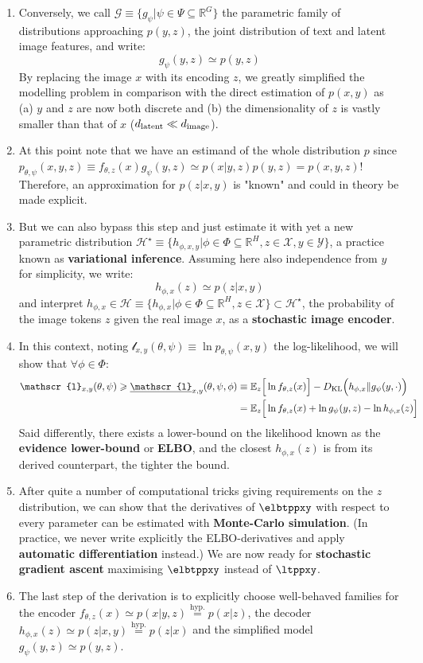 \documentclass{article}
\begin{document}
\begin{appendix}
\begin{enumerate}
    \item Conversely, we call $\mathcal{G}\equiv\{g_{\psi}|\psi\in\Psi\subseteq\mathbb{R}^{G}\}$ the parametric family of distributions approaching $p(y,z)$, the joint distribution of text and latent image features, and write:
    $$g_{\psi}(y,z)\simeq p(y,z)$$ By replacing the image $x$ with its encoding $z$, we greatly simplified the modelling problem in comparison with the direct estimation of $p(x,y)$ as (a) $y$ and $z$ are now both discrete and (b) the dimensionality of $z$ is vastly smaller than that of $x$ (${d_{\mathrm{latent}}}\ll d_{\mathrm{image}}$).
    \item At this point note that we have an estimand of the whole distribution $p$ since $p_{\theta,\psi}(x,y,z)\equiv f_{\theta,z}(x)g_{\psi}(y,z)\simeq p(x|y,z)p(y,z)=p(x,y,z)$! Therefore, an approximation for $p(z|x,y)$ is "known" and could in theory be made explicit.
    \item But we can also bypass this step and just estimate it with yet a new parametric distribution $\mathcal{H}^\star\equiv \{h_{\phi,x,y}|\phi\in\Phi\subseteq\mathbb{R}^{H},z\in\mathcal{X},y\in\mathcal{Y}\}$, a practice known as \textbf{variational inference}. Assuming here also independence from $y$ for simplicity, we write:
    $$h_{\phi,x}(z)\simeq p(z|x,y)$$
    and interpret $h_{\phi,x}\in\mathcal{H}\equiv \{h_{\phi,x}|\phi\in\Phi\subseteq\mathbb{R}^{H},z\in\mathcal{X}\}\subset\mathcal{H}^\star$, the probability of the image tokens $z$ given the real image $x$, as a \textbf{stochastic image encoder}.
    \item In this context, noting $\mathscr{l}_{x,y}(\theta,\psi) \equiv \ln p_{\theta,\psi}(x,y)$ the log-likelihood, we will show that $\forall \phi \in \Phi$:
    \begin{align*}
    \mathscr{l}_{x,y}(\theta,\psi) \geqslant \underline{\mathscr{l}}_{x,y}(\theta,\psi,\phi) &\equiv \mathbb{E}_z \Big[\ln f_{\theta,z}(x)\Big] - \KL \Big( h_{\phi,x} \| g_\psi(y,\cdot) \Big) \\ & =\mathbb{E}_z \Big[\ln f_{\theta,z}(x)+\ln g_\psi(y,z) -\ln h_{\phi,x}(z)\Big]
    \end{align*}
    Said differently, there exists a lower-bound on the likelihood known as the \textbf{evidence lower-bound} or \textbf{ELBO}, and the closest $h_{\phi,x}(z)$ is from its derived counterpart, the tighter the bound.
    \item After quite a number of computational tricks giving requirements on the $z$ distribution, we can show that the derivatives of $\elbtppxy$ with respect to every parameter can be estimated with \textbf{Monte-Carlo simulation}. (In practice, we never write explicitly the ELBO-derivatives and apply \textbf{automatic differentiation} instead.) We are now ready for \textbf{stochastic gradient ascent} maximising $\elbtppxy$ instead of $\ltppxy$.
    \item The last step of the derivation is to explicitly choose well-behaved families for the encoder $f_{\theta,z}(x)\simeq  p(x |y,z)\overset{\text{hyp.}}{=}p(x|z)$, the decoder $h_{\phi,x}(z) \simeq  p(z |x,y)\overset{\text{hyp.}}{=}p(z|x)$ and the simplified model $g_\psi(y,z)\simeq p(y,z)$.
    

\end{enumerate}
\end{appendix}
\end{document}
